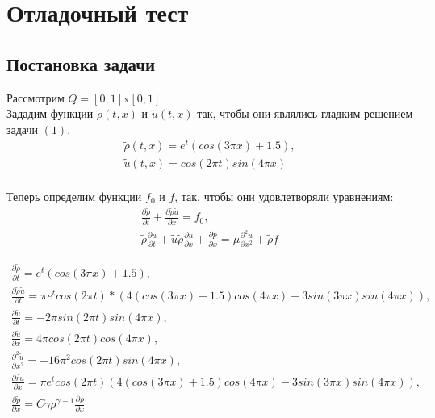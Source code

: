 \section{Отладочный тест}
\subsection{Постановка задачи}

Рассмотрим $Q = [0;1]$x$[0;1]$\\

Зададим функции $\tilde{\rho}(t, x)$ и $\tilde{u}(t, x)$ так, чтобы они являлись гладким решением задачи $(1)$.
\begin{equation}
	\begin{array}{lc}
		\tilde{\rho}(t, x) = e^t(cos(3\pi x) + 1.5),\\
		\tilde{u}(t, x) = cos(2\pi t)sin(4\pi x)\\
	\end{array}
\end{equation}

Теперь определим функции $f_0$ и $f$, так, чтобы они удовлетворяли уравнениям:
\begin{equation}
	\begin{array}{lc}
		\frac{\partial\tilde{\rho}}{\partial t} + \frac{\partial\tilde{\rho}\tilde{u}}{\partial x} = f_0,\\
		\tilde{\rho}\frac{\partial\tilde{u}}{\partial t} + \tilde{u}\tilde{\rho}\frac{\partial\tilde{u}}{\partial x} + \frac{\partial p}{\partial x} = \mu\frac{\partial^2\tilde{u}}{\partial x^2} + \tilde{\rho}f
	\end{array}
\end{equation}

\begin{equation}
	\begin{array}{lc}
		\frac{\partial\tilde{\rho}}{\partial t}  = e^t(cos(3\pi x) + 1.5), \\
		\frac{\partial\tilde{\rho}\tilde{u}}{\partial t}  = \pi e^t cos(2\pi t) * (4(cos(3\pi x) + 1.5) cos (4\pi x) - 3sin(3\pi x )sin(4\pi x)), \\
		
		\frac{\partial\tilde{u}}{\partial t} = -2\pi sin(2\pi t)sin(4\pi x),\\				\frac{\partial\tilde{u}}{\partial x} = 4\pi cos(2\pi t)cos(4\pi x),\\
		\frac{\partial^2\tilde{u}}{\partial x^2} = -16\pi^2 cos(2\pi t)sin(4\pi x),\\
		\frac{\partial\tilde{ru}}{\partial x} = \pi e^t cos(2\pi t) (4(cos(3\pi x) + 1.5)cos(4\pi x) - 3sin(3\pi x)sin(4\pi x)),\\
		\frac{\partial\tilde{p}}{\partial x} = C\gamma \rho^{\gamma - 1} \frac{\partial \rho}{\partial x}		
	\end{array}
\end{equation}
\newpage

